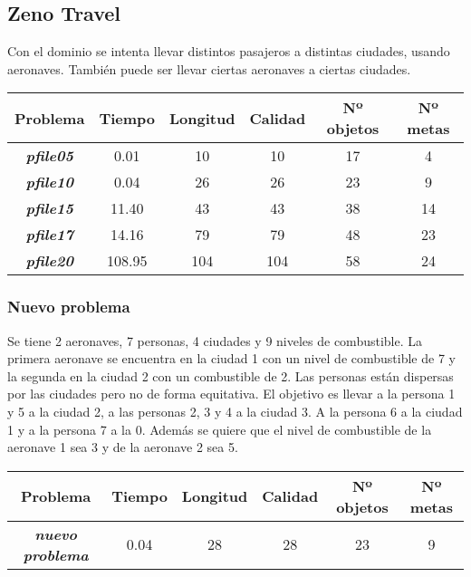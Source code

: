 \documentclass{uc3mpracticas}
\begin{document}
\subsection{Zeno Travel}

Con el dominio se intenta llevar distintos pasajeros a distintas ciudades, usando aeronaves. También puede ser llevar ciertas aeronaves a ciertas ciudades.

\begin{center}
  \begin{tabular}{|c|c|c|c|c|c|}
    \hline
                  \textbf{Problema}       & \textbf{Tiempo} & \textbf{Longitud} & \textbf{Calidad} & \textbf{Nº objetos} & \textbf{Nº metas}\\ \hline \hline
        \textit{\textbf{pfile05}}         &  0.01           & 10                & 10               & 17                  & 4            \\ \hline
        \textit{\textbf{pfile10}}         &  0.04           & 26                & 26               & 23                  & 9            \\ \hline
        \textit{\textbf{pfile15}}         &  11.40          & 43                & 43               & 38                  & 14           \\ \hline
        \textit{\textbf{pfile17}}         &  14.16          & 79                & 79               & 48                  & 23           \\ \hline
        \textit{\textbf{pfile20}}         &  108.95         & 104               & 104              & 58                  & 24            \\ \hline
  \end{tabular}
\end{center}


\subsubsection*{Nuevo problema}

Se tiene 2 aeronaves, 7 personas, 4 ciudades y 9 niveles de combustible. La primera aeronave se encuentra en la ciudad 1 con un nivel de combustible de 7 y la segunda en la ciudad 2 con un combustible de 2. Las personas están dispersas por las ciudades pero no de forma equitativa. El objetivo es llevar a la persona 1 y 5 a la ciudad 2, a las personas 2, 3 y 4 a la ciudad 3. A la persona 6 a la ciudad 1 y a la persona 7 a la 0. Además se quiere que el nivel de combustible de la aeronave 1 sea 3 y de la aeronave 2 sea 5.


\begin{center}
  \begin{tabular}{|c|c|c|c|c|c|}
    \hline
                  \textbf{Problema}       & \textbf{Tiempo} & \textbf{Longitud} & \textbf{Calidad} & \textbf{Nº objetos} & \textbf{Nº metas}\\ \hline \hline
        \textit{\textbf{nuevo problema}}  &  0.04           & 28                & 28               & 23                  & 9                \\ \hline
  \end{tabular}
\end{center}
\end{document}
